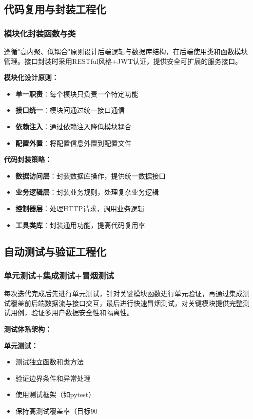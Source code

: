 \documentclass[a4paper]{article}
\begin{document}
\subsection{代码复用与封装工程化}

\subsubsection{模块化封装函数与类}

遵循"高内聚、低耦合"原则设计后端逻辑与数据库结构，在后端使用类和函数模块管理。接口封装时采用RESTful风格+JWT认证，提供安全可扩展的服务接口。

\textbf{模块化设计原则：}
\begin{itemize}
    \item \textbf{单一职责}：每个模块只负责一个特定功能
    \item \textbf{接口统一}：模块间通过统一接口通信
    \item \textbf{依赖注入}：通过依赖注入降低模块耦合
    \item \textbf{配置外置}：将配置信息外置到配置文件
\end{itemize}

\textbf{代码封装策略：}
\begin{itemize}
    \item \textbf{数据访问层}：封装数据库操作，提供统一数据接口
    \item \textbf{业务逻辑层}：封装业务规则，处理复杂业务逻辑
    \item \textbf{控制器层}：处理HTTP请求，调用业务逻辑
    \item \textbf{工具类库}：封装通用功能，提高代码复用率
\end{itemize}

\subsection{自动测试与验证工程化}

\subsubsection{单元测试+集成测试+冒烟测试}

每次迭代完成后先进行单元测试，针对关键模块函数进行单元验证，再通过集成测试覆盖前后端数据流与接口交互，最后进行快速冒烟测试，对关键模块提供完整测试用例，验证多用户数据安全性和隔离性。

\textbf{测试体系架构：}

\textbf{单元测试：}
\begin{itemize}
    \item 测试独立函数和类方法
    \item 验证边界条件和异常处理
    \item 使用测试框架（如pytest）
    \item 保持高测试覆盖率（目标90%
\end{itemize}
\end{document}
